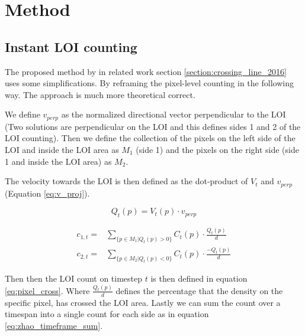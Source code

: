 \chapter{Method}

\section{Instant LOI counting}

The proposed method by \cite{leibe_crossing-line_2016} in related work section \ref{section:crossing_line_2016} uses some simplifications. By reframing the pixel-level counting in the following way. The approach is much more theoretical correct.

\label{sec:pixel_level}
We define $v_{perp}$ as the normalized directional vector perpendicular to the LOI (Two solutions are perpendicular on the LOI and this defines sides 1 and 2 of the LOI counting). Then we define the collection of the pixels on the left side of the LOI and inside the LOI area as $M_1$ (side 1) and the pixels on the right side (side 1 and inside the LOI area) as $M_2$.

The velocity towards the LOI is then defined as the dot-product of $V_t$ and $v_{perp}$ (Equation \ref{eq:v_proj}).

\begin{equation}
	Q_t(p) = V_t(p) \cdot v_{perp}
	\label{eq:v_proj}
\end{equation}


\begin{equation}
\begin{aligned}
	c_{1,t} =& \sum_{\{p \in M_1 | Q_t(p) > 0\}} C_t(p) \cdot \frac{Q_t(p)}{d}\\
	c_{2,t} =& \sum_{\{p \in M_2 | Q_t(p) < 0\}} C_t(p) \cdot \frac{-Q_t(p)}{d}
\end{aligned}
\label{eq:pixel_cross}
\end{equation}

Then then the LOI count on timestep $t$ is then defined in equation \ref{eq:pixel_cross}. Where $\frac{Q_t(p)}{d}$ defines the percentage that the density on the specific pixel, has crossed the LOI area. Lastly we can sum the count over a timespan into a single count for each side as in equation \ref{eq:zhao_timeframe_sum}.

